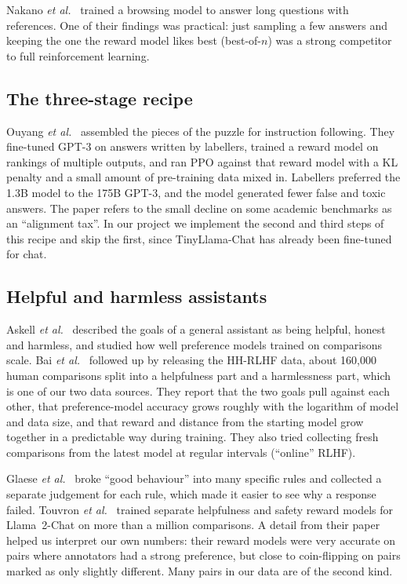 Nakano \emph{et al.}~\cite{nakano2021webgpt} trained a browsing model to answer long questions with references. One of their findings was practical: just sampling a few answers and keeping the one the reward model likes best (best-of-$n$) was a strong competitor to full reinforcement learning.

\subsection{The three-stage recipe}
Ouyang \emph{et al.}~\cite{ouyang2022instructgpt} assembled the pieces of the puzzle for instruction following. They fine-tuned GPT-3 on answers written by labellers, trained a reward model on rankings of multiple outputs, and ran PPO against that reward model with a KL penalty and a small amount of pre-training data mixed in. Labellers preferred the 1.3B model to the 175B GPT-3, and the model generated fewer false and toxic answers. The paper refers to the small decline on some academic benchmarks as an ``alignment tax''. In our project we implement the second and third steps of this recipe and skip the first, since TinyLlama-Chat has already been fine-tuned for chat.

\subsection{Helpful and harmless assistants}
Askell \emph{et al.}~\cite{askell2021general} described the goals of a general assistant as being helpful, honest and harmless, and studied how well preference models trained on comparisons scale. Bai \emph{et al.}~\cite{bai2022hh} followed up by releasing the HH-RLHF data, about 160,000 human comparisons split into a helpfulness part and a harmlessness part, which is one of our two data sources. They report that the two goals pull against each other, that preference-model accuracy grows roughly with the logarithm of model and data size, and that reward and distance from the starting model grow together in a predictable way during training. They also tried collecting fresh comparisons from the latest model at regular intervals (``online'' RLHF).

Glaese \emph{et al.}~\cite{glaese2022sparrow} broke ``good behaviour'' into many specific rules and collected a separate judgement for each rule, which made it easier to see why a response failed. Touvron \emph{et al.}~\cite{touvron2023llama2} trained separate helpfulness and safety reward models for Llama~2-Chat on more than a million comparisons. A detail from their paper helped us interpret our own numbers: their reward models were very accurate on pairs where annotators had a strong preference, but close to coin-flipping on pairs marked as only slightly different. Many pairs in our data are of the second kind.

